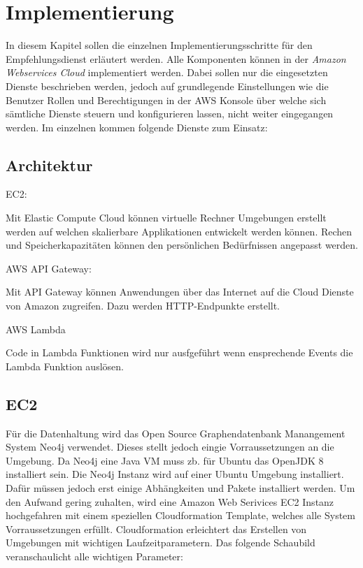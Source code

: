 \section{Implementierung}\label{implementaion}


 In diesem Kapitel sollen die einzelnen Implementierungsschritte für den Empfehlungsdienst erläutert werden. Alle Komponenten können in der \textit{Amazon Webservices Cloud} implementiert werden. Dabei sollen nur die eingesetzten Dienste beschrieben werden, jedoch auf grundlegende Einstellungen wie die Benutzer Rollen und Berechtigungen in der AWS Konsole über welche sich sämtliche Dienste steuern und konfigurieren lassen, nicht weiter eingegangen werden. Im einzelnen kommen folgende Dienste zum Einsatz:

\subsection{Architektur}

EC2:

Mit Elastic Compute Cloud können virtuelle Rechner Umgebungen erstellt werden auf welchen skalierbare Applikationen entwickelt werden können. Rechen und Speicherkapazitäten können den persönlichen Bedürfnissen angepasst werden. 

AWS API Gateway:

Mit API Gateway können Anwendungen über das Internet auf die Cloud Dienste von Amazon zugreifen. Dazu werden HTTP-Endpunkte erstellt.

AWS Lambda

Code in Lambda Funktionen wird nur ausfgeführt wenn ensprechende Events die Lambda Funktion auslösen.

  \subsection{EC2 }
Für die Datenhaltung wird das Open Source Graphendatenbank Manangement System Neo4j verwendet. Dieses stellt jedoch eingie Vorraussetzungen an die Umgebung\cite{neo4jsysreq}. Da Neo4j eine Java VM muss zb. für Ubuntu das OpenJDK 8 installiert sein.
Die Neo4j Instanz wird auf einer Ubuntu Umgebung installiert. Dafür müssen jedoch erst einige Abhängkeiten und Pakete installiert werden. Um den Aufwand gering zuhalten, wird eine Amazon Web Serivices EC2 Instanz hochgefahren mit einem speziellen Cloudformation Template, welches alle System Vorraussetzungen erfüllt. Cloudformation erleichtert das Erstellen von Umgebungen mit wichtigen Laufzeitparametern. Das folgende Schaubild veranschaulicht alle wichtigen Parameter:

